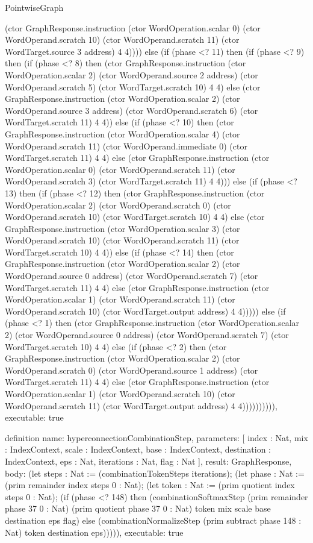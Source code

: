\begin{lexlean}{PointwiseGraph}
\begin{semanticmodule}
{(ctor GraphResponse.instruction (ctor WordOperation.scalar 0) (ctor WordOperand.scratch 10) (ctor WordOperand.scratch 11) (ctor WordTarget.source 3 address) 4 4)))) else (if (phase <? 11) then (if (phase <? 9) then (if (phase <? 8) then (ctor GraphResponse.instruction (ctor WordOperation.scalar 2) (ctor WordOperand.source 2 address) (ctor WordOperand.scratch 5) (ctor WordTarget.scratch 10) 4 4) else (ctor GraphResponse.instruction (ctor WordOperation.scalar 2) (ctor WordOperand.source 3 address) (ctor WordOperand.scratch 6) (ctor WordTarget.scratch 11) 4 4)) else (if (phase <? 10) then (ctor GraphResponse.instruction (ctor WordOperation.scalar 4) (ctor WordOperand.scratch 11) (ctor WordOperand.immediate 0) (ctor WordTarget.scratch 11) 4 4) else (ctor GraphResponse.instruction (ctor WordOperation.scalar 0) (ctor WordOperand.scratch 11) (ctor WordOperand.scratch 3) (ctor WordTarget.scratch 11) 4 4))) else (if (phase <? 13) then (if (phase <? 12) then (ctor GraphResponse.instruction (ctor WordOperation.scalar 2) (ctor WordOperand.scratch 0) (ctor WordOperand.scratch 10) (ctor WordTarget.scratch 10) 4 4) else (ctor GraphResponse.instruction (ctor WordOperation.scalar 3) (ctor WordOperand.scratch 10) (ctor WordOperand.scratch 11) (ctor WordTarget.scratch 10) 4 4)) else (if (phase <? 14) then (ctor GraphResponse.instruction (ctor WordOperation.scalar 2) (ctor WordOperand.source 0 address) (ctor WordOperand.scratch 7) (ctor WordTarget.scratch 11) 4 4) else (ctor GraphResponse.instruction (ctor WordOperation.scalar 1) (ctor WordOperand.scratch 11) (ctor WordOperand.scratch 10) (ctor WordTarget.output address) 4 4))))) else (if (phase <? 1) then (ctor GraphResponse.instruction (ctor WordOperation.scalar 2) (ctor WordOperand.source 0 address) (ctor WordOperand.scratch 7) (ctor WordTarget.scratch 10) 4 4) else (if (phase <? 2) then (ctor GraphResponse.instruction (ctor WordOperation.scalar 2) (ctor WordOperand.scratch 0) (ctor WordOperand.source 1 address) (ctor WordTarget.scratch 11) 4 4) else (ctor GraphResponse.instruction (ctor WordOperation.scalar 1) (ctor WordOperand.scratch 10) (ctor WordOperand.scratch 11) (ctor WordTarget.output address) 4 4)))))))))),
  executable: true
}

definition{
  name: hyperconnectionCombinationStep,
  parameters: [
    index : Nat,
    mix : IndexContext,
    scale : IndexContext,
    base : IndexContext,
    destination : IndexContext,
    eps : Nat,
    iterations : Nat,
    flag : Nat
  ],
  result: GraphResponse,
  body: (let steps : Nat := (combinationTokenSteps iterations); (let phase : Nat := (prim remainder index steps 0 : Nat); (let token : Nat := (prim quotient index steps 0 : Nat); (if (phase <? 148) then (combinationSoftmaxStep (prim remainder phase 37 0 : Nat) (prim quotient phase 37 0 : Nat) token mix scale base destination eps flag) else (combinationNormalizeStep (prim subtract phase 148 : Nat) token destination eps))))),
  executable: true
}


\end{semanticmodule}
\end{lexlean}
